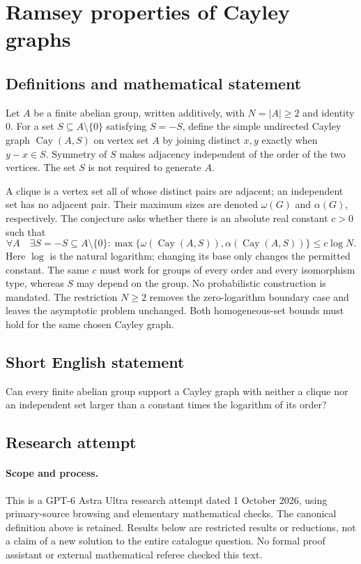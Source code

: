 \documentclass[11pt,a4paper]{article}
\begin{document}
\section*{Ramsey properties of Cayley graphs}\label{statement}

\subsection{Definitions and mathematical statement}
Let $A$ be a finite abelian group, written additively, with
$N=|A|\geq2$ and identity $0$. For a set
$S\subseteq A\setminus\{0\}$ satisfying $S=-S$, define the simple
undirected Cayley graph $\operatorname{Cay}(A,S)$ on vertex set $A$
by joining distinct $x,y$ exactly when $y-x\in S$. Symmetry of $S$
makes adjacency independent of the order of the two vertices.
The set $S$ is not required to generate $A$.

A clique is a vertex set all of whose distinct pairs are adjacent;
an independent set has no adjacent pair. Their maximum sizes are
denoted $\omega(G)$ and $\alpha(G)$, respectively. The conjecture
asks whether there is an absolute real constant $c>0$ such that
\[
 \forall A\quad\exists S=-S\subseteq A\setminus\{0\}:
 \max\{\omega(\operatorname{Cay}(A,S)),
        \alpha(\operatorname{Cay}(A,S))\}\leq c\log N.
\]
Here $\log$ is the natural logarithm; changing its base only changes
the permitted constant. The same $c$ must work for groups of every
order and every isomorphism type, whereas $S$ may depend on the
group. No probabilistic construction is mandated. The restriction
$N\geq2$ removes the zero-logarithm boundary case and leaves the
asymptotic problem unchanged. Both homogeneous-set bounds must hold
for the same chosen Cayley graph.
\subsection{Short English statement}
Can every finite abelian group support a Cayley graph with neither a clique nor an independent set larger than a constant times the logarithm of its order?
\subsection{Research attempt}
\paragraph{Scope and process.}
This is a GPT-6 Astra Ultra research attempt dated 1 October 2026, using
primary-source browsing and elementary mathematical checks. The canonical
definition above is retained. Results below are restricted results or
reductions, not a claim of a new solution to the entire catalogue question.
No formal proof assistant or external mathematical referee checked this text.
\end{document}
